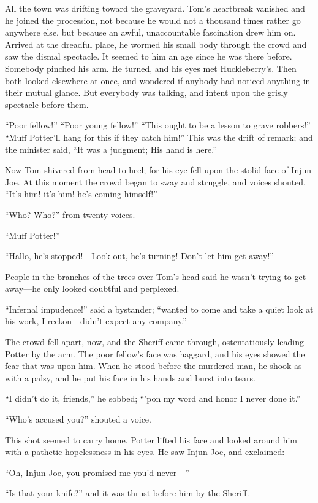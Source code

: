 \documentclass{book}
\begin{document}
All the town was drifting toward the graveyard. Tom’s heartbreak vanished and he joined the procession, not because he would not a thousand times rather go anywhere else, but because an awful, unaccountable fascination drew him on. Arrived at the dreadful place, he wormed his small body through the crowd and saw the dismal spectacle. It seemed to him an age since he was there before. Somebody pinched his arm. He turned, and his eyes met Huckleberry’s. Then both looked elsewhere at once, and wondered if anybody had noticed anything in their mutual glance. But everybody was talking, and intent upon the grisly spectacle before them.

“Poor fellow!” “Poor young fellow!” “This ought to be a lesson to grave robbers!” “Muff Potter’ll hang for this if they catch him!” This was the drift of remark; and the minister said, “It was a judgment; His hand is here.”

Now Tom shivered from head to heel; for his eye fell upon the stolid face of Injun Joe. At this moment the crowd began to sway and struggle, and voices shouted, “It’s him! it’s him! he’s coming himself!”

“Who? Who?” from twenty voices.

“Muff Potter!”

“Hallo, he’s stopped!—Look out, he’s turning! Don’t let him get away!”

People in the branches of the trees over Tom’s head said he wasn’t trying to get away—he only looked doubtful and perplexed.

“Infernal impudence!” said a bystander; “wanted to come and take a quiet look at his work, I reckon—didn’t expect any company.”

The crowd fell apart, now, and the Sheriff came through, ostentatiously leading Potter by the arm. The poor fellow’s face was haggard, and his eyes showed the fear that was upon him. When he stood before the murdered man, he shook as with a palsy, and he put his face in his hands and burst into tears.

“I didn’t do it, friends,” he sobbed; “’pon my word and honor I never done it.”

“Who’s accused you?” shouted a voice.

This shot seemed to carry home. Potter lifted his face and looked around him with a pathetic hopelessness in his eyes. He saw Injun Joe, and exclaimed:

“Oh, Injun Joe, you promised me you’d never—”

“Is that your knife?” and it was thrust before him by the Sheriff.
\end{document}
